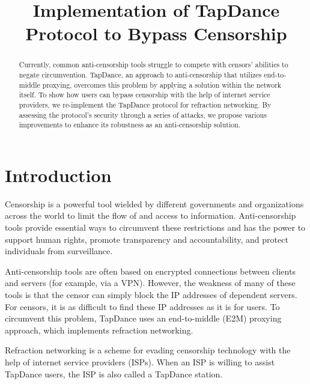 \documentclass[conference]{IEEEtran}
\begin{document}
\title{Implementation of TapDance Protocol to Bypass Censorship}


\author{
\and
{}
\and
{}
\and
{}
\and
{}
}

\maketitle

\begin{abstract}

Currently, common anti-censorship tools struggle to compete with censors' abilities to negate circumvention. TapDance, an approach to anti-censorship that utilizes end-to-middle proxying, overcomes this problem by applying a solution within the network itself. To show how users can bypass censorship with the help of internet service providers, we re-implement the TapDance protocol for refraction networking. By assessing the protocol's security through a series of attacks, we propose various improvements to enhance its robustness as an anti-censorship solution.

\end{abstract}

\section{Introduction}

Censorship is a powerful tool wielded by different governments and organizations across the world to limit the flow of and access to information. Anti-censorship tools provide essential ways to circumvent these restrictions and has the power to support human rights, promote transparency and accountability, and protect individuals from surveillance.

Anti-censorship tools are often based on encrypted connections between clients and servers (for example, via a VPN). However, the weakness of many of these tools is that the censor can simply block the IP addresses of dependent servers. For censors, it is as difficult to find these IP addresses as it is for users. To circumvent this problem, TapDance uses an end-to-middle (E2M) proxying approach, which implements refraction networking.

Refraction networking is a scheme for evading censorship technology with the help of internet service providers (ISPs). When an ISP is willing to assist TapDance users, the ISP is also called a TapDance station.
\end{document}
